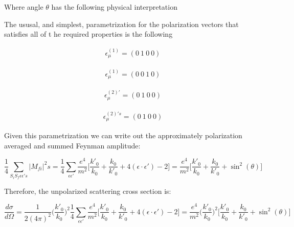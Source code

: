 \documentclass[a4]{article}
\begin{document}
    Where angle $\theta$ has the following physical interpretation


    The ususal, and simplest, parametrization for the polarization vectors that satisfies all of t he required properties is the following

    \begin{equation}
        \begin{aligned}
            \epsilon_{\mu}^{(1)}  = (0 \: 1 \: 0 \: 0)
        \end{aligned}
    \end{equation}

    \begin{equation}
        \begin{aligned}
            \epsilon_{\mu}^{(1)}  = (0 \: 0 \: 1 \: 0)
        \end{aligned}
    \end{equation}

    \begin{equation}
        \begin{aligned}
            \epsilon_{\mu}^{(2)'}  = (0 \: 1 \: 0 \: 0)
        \end{aligned}
    \end{equation}

    \begin{equation}
        \begin{aligned}
            \epsilon_{\mu}^{(2)'s}  = (0 \: 1 \: 0 \: 0)
        \end{aligned}
    \end{equation}

    Given this parametrization we can write out the approximately polarization averaged and summed Feynman amplitude:

    \begin{equation}
        \frac{1}{4} \sum_{S_i S_f \epsilon \epsilon's} |M_{fi}|^2s = \frac{1}{4} \sum_{\epsilon \epsilon'} \frac{e^4}{m^2} \Big[ \frac{k'_0}{k_0} + \frac{k_0}{k'_0} + 4 (\epsilon \cdot \epsilon') - 2 \Big] = \frac{e^4}{m^2} \Big[ \frac{k'_0}{k_0} + \frac{k_0}{k'_0} + \sin^2 (\theta) \Big]
    \end{equation}

    Therefore, the unpolarized scattering cross section is:

    \begin{equation}
        \frac{d \sigma}{d \Omega} = \frac{1}{2 (4 \pi)^2} \bigg( \frac{k'_0}{k_0} \bigg)^2 \frac{1}{4} \sum_{\epsilon \epsilon'} \frac{e^4}{m^2} \Big[ \frac{k'_0}{k_0} + \frac{k_0}{k'_0} + 4 (\epsilon \cdot \epsilon') - 2 \Big] = \frac{e^4}{m^2} \bigg( \frac{k'_0}{k_0} \bigg)^2 \Big[ \frac{k'_0}{k_0} + \frac{k_0}{k'_0} + \sin^2 (\theta) \Big]
    \end{equation}
\end{document}
